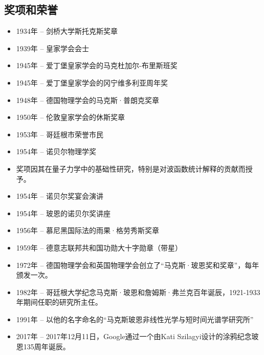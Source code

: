 \subsection{奖项和荣誉}
\begin{itemize}
\item 1934年 – 剑桥大学斯托克斯奖章  
\item 1939年 – 皇家学会会士  
\item 1945年 – 爱丁堡皇家学会的马克杜加尔-布里斯班奖  
\item 1945年 – 爱丁堡皇家学会的冈宁维多利亚周年奖  
\item 1948年 – 德国物理学会的马克斯·普朗克奖章  
\item 1950年 – 伦敦皇家学会的休斯奖章  
\item 1953年 – 哥廷根市荣誉市民  
\item 1954年 – 诺贝尔物理学奖  
  \item 奖项因其在量子力学中的基础性研究，特别是对波函数统计解释的贡献而授予。  
  \item 1954年 – 诺贝尔奖宴会演讲  
  \item 1954年 – 玻恩的诺贝尔奖讲座  
\item 1956年 – 慕尼黑国际法的雨果·格劳秀斯奖章  
\item 1959年 – 德意志联邦共和国功勋大十字勋章（带星）  
\item 1972年 – 德国物理学会和英国物理学会创立了“马克斯·玻恩奖和奖章”，每年颁发一次。  
\item 1982年 – 哥廷根大学纪念马克斯·玻恩和詹姆斯·弗兰克百年诞辰，1921-1933年期间任职的研究所主任。  
\item 1991年 – 以他的名字命名的“马克斯玻恩非线性光学与短时间光谱学研究所”  
\item 2017年 – 2017年12月11日，Google通过一个由Kati Szilagyi设计的涂鸦纪念玻恩135周年诞辰。
\end{itemize}  
